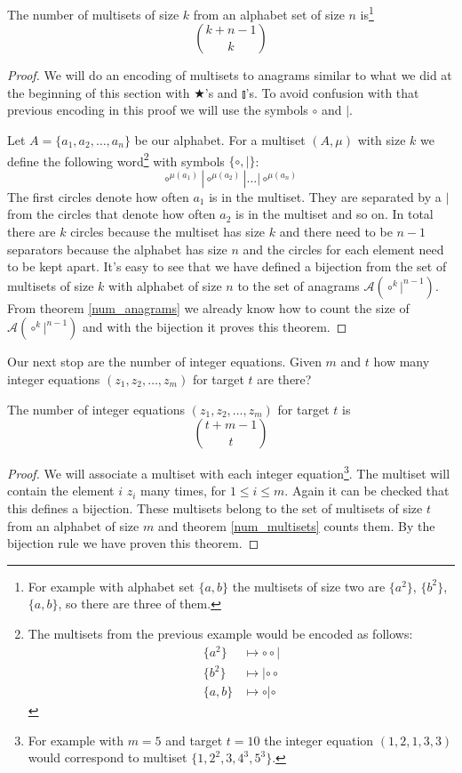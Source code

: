\begin{thm}\label{num_multisets}
The number of multisets of size $k$ from an alphabet set of size $n$ is\footnote{For example with alphabet set $\{a, b\}$ the multisets of size two are $\{a^2\}$, $\{b^2\}$, $\{a, b\}$, so there are three of them.}
$$
\binom{k + n - 1}{k}
$$
\end{thm}

\begin{proof}
We will do an encoding of multisets to anagrams similar to what we did at the beginning of this section with $\bigstar$'s and $\talloblong$'s. To avoid confusion with that previous encoding in this proof we will use the symbols $\circ$ and $|$.

Let $A=\{a_1, a_2, \ldots, a_n\}$ be our alphabet. For a multiset $(A, \mu)$ with size $k$ we define the following word\footnote{The multisets from the previous example would be encoded as follows:
\begin{align*}
\{a^2\} & \mapsto \circ\circ|\\
\{b^2\} & \mapsto |\circ\circ\\
\{a, b\} & \mapsto \circ|\circ
\end{align*}} with symbols $\{\circ,|\}$:
$$
\circ^{\mu(a_1)}|\circ^{\mu(a_2)}| \ldots |\circ^{\mu(a_n)}
$$
The first circles denote how often $a_1$ is in the multiset. They are separated by a $|$ from the circles that denote how often $a_2$ is in the multiset and so on. In total there are $k$ circles because the multiset has size $k$ and there need to be $n-1$ separators because the alphabet has size $n$ and the circles for each element need to be kept apart. It's easy to see that we have defined a bijection from the set of multisets of size $k$ with alphabet of size $n$ to the set of anagrams $\mathcal{A}(\circ^k|^{n-1})$. From theorem \ref{num_anagrams} we already know how to count the size of $\mathcal{A}(\circ^k|^{n-1})$ and with the bijection it proves this theorem.
\end{proof}

Our next stop are the number of integer equations. Given $m$ and $t$ how many integer equations $(z_1, z_2, \ldots, z_m)$ for target $t$ are there?

\begin{thm}\label{num_int_equations}
The number of integer equations $(z_1, z_2, \ldots, z_m)$ for target $t$ is
$$
\binom{t + m - 1}{t}
$$
\end{thm}

\begin{proof}
We will associate a multiset with each integer equation\footnote{For example with $m = 5$ and target $t = 10$ the integer equation $(1, 2, 1, 3, 3)$ would correspond to multiset $\{1, 2^2, 3, 4^3, 5^3\}$.}. The multiset will contain the element $i$ $z_i$ many times, for $1 \leq i \leq m$. Again it can be checked that this defines a bijection. These multisets belong to the set of multisets of size $t$ from an alphabet of size $m$ and theorem \ref{num_multisets} counts them. By the bijection rule we have proven this theorem.
\end{proof}

